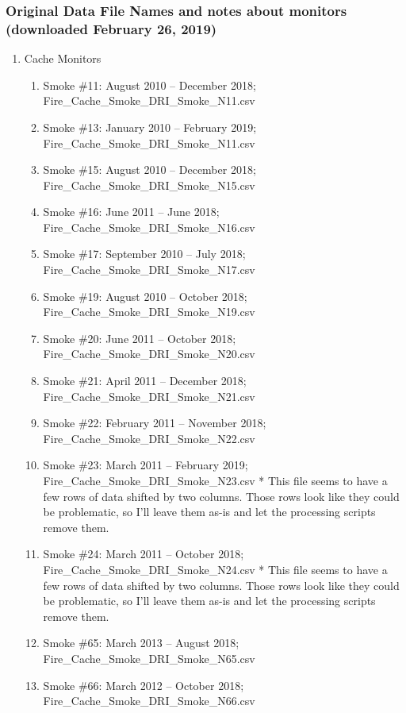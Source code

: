 \subsubsection*{Original Data File Names and notes about monitors (downloaded February 26, 2019)}
 \renewcommand{\labelenumii}{\arabic{enumii}}
\begin{enumerate}%
\item Cache Monitors

\begin{enumerate}[nolistsep]
\item Smoke \#11: August 2010 -- December 2018; Fire\_Cache\_Smoke\_DRI\_Smoke\_N11.csv
\item Smoke \#13: January 2010 -- February 2019; Fire\_Cache\_Smoke\_DRI\_Smoke\_N11.csv
\item Smoke \#15: August 2010 -- December 2018; Fire\_Cache\_Smoke\_DRI\_Smoke\_N15.csv
\item Smoke \#16: June 2011 -- June 2018; Fire\_Cache\_Smoke\_DRI\_Smoke\_N16.csv
\item Smoke \#17: September 2010 -- July 2018; Fire\_Cache\_Smoke\_DRI\_Smoke\_N17.csv
\item Smoke \#19: August 2010 -- October 2018; Fire\_Cache\_Smoke\_DRI\_Smoke\_N19.csv
\item Smoke \#20: June 2011 -- October 2018; Fire\_Cache\_Smoke\_DRI\_Smoke\_N20.csv
\item Smoke \#21: April 2011 -- December 2018; Fire\_Cache\_Smoke\_DRI\_Smoke\_N21.csv
\item Smoke \#22: February 2011 -- November 2018; Fire\_Cache\_Smoke\_DRI\_Smoke\_N22.csv
\item Smoke \#23: March 2011 -- February 2019; Fire\_Cache\_Smoke\_DRI\_Smoke\_N23.csv * This file seems to have a few rows of data shifted by two columns. Those rows look like they could be problematic, so I'll leave them as-is and let the processing scripts remove them.
\item Smoke \#24: March 2011 -- October 2018; Fire\_Cache\_Smoke\_DRI\_Smoke\_N24.csv * This file seems to have a few rows of data shifted by two columns. Those rows look like they could be problematic, so I'll leave them as-is and let the processing scripts remove them.
\item Smoke \#65: March 2013 -- August 2018; Fire\_Cache\_Smoke\_DRI\_Smoke\_N65.csv
\item Smoke \#66: March 2012 -- October 2018; Fire\_Cache\_Smoke\_DRI\_Smoke\_N66.csv

\end{enumerate}
\end{enumerate}
